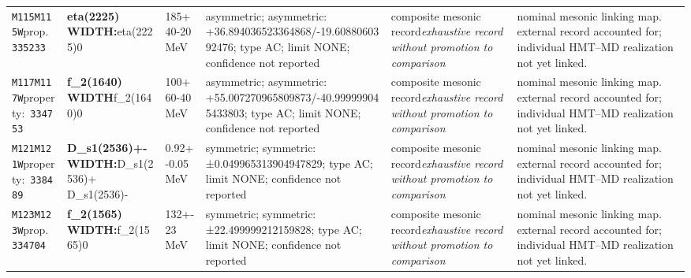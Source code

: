 \begin{landscape}
\begin{longtable}{L{1.85cm}L{4.45cm}L{2.35cm}L{4.05cm}L{3.35cm}L{7.15cm}}
\texttt{M115}\newline \texttt{M115W}\newline prop.\ \texttt{335233} & \textbf{eta(2225) WIDTH:}\newline eta(2225)0 & 185+40-20\,MeV & asymmetric; asymmetric: +36.894036523364868/-19.6088060392476; type AC; limit NONE; confidence not reported & composite mesonic record\newline \emph{exhaustive record without promotion to comparison} & nominal mesonic linking map. external record accounted for; individual HMT--MD realization not yet linked. \\
\texttt{M117}\newline \texttt{M117W}\newline property:\ \texttt{334753} & \textbf{f\_\allowbreak{}2(1640) WIDTH}\newline f\_\allowbreak{}2(1640)0 & 100+60-40\,MeV & asymmetric; asymmetric: +55.007270965809873/-40.999999045433803; type AC; limit NONE; confidence not reported & composite mesonic record\newline \emph{exhaustive record without promotion to comparison} & nominal mesonic linking map. external record accounted for; individual HMT--MD realization not yet linked. \\
\texttt{M121}\newline \texttt{M121W}\newline property:\ \texttt{338489} & \textbf{D\_\allowbreak{}s1(2536)+- WIDTH:}\newline D\_\allowbreak{}s1(2536)+ \textbar{}\allowbreak{} D\_\allowbreak{}s1(2536)- & 0.92+-0.05\,MeV & symmetric; symmetric: ±0.049965313904947829; type AC; limit NONE; confidence not reported & composite mesonic record\newline \emph{exhaustive record without promotion to comparison} & nominal mesonic linking map. external record accounted for; individual HMT--MD realization not yet linked. \\
\texttt{M123}\newline \texttt{M123W}\newline prop.\ \texttt{334704} & \textbf{f\_\allowbreak{}2(1565) WIDTH:}\newline f\_\allowbreak{}2(1565)0 & 132+-23\,MeV & symmetric; symmetric: ±22.499999212159828; type AC; limit NONE; confidence not reported & composite mesonic record\newline \emph{exhaustive record without promotion to comparison} & nominal mesonic linking map. external record accounted for; individual HMT--MD realization not yet linked. \\

\end{longtable}
\end{landscape}
